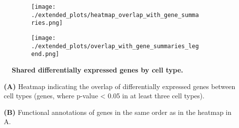 \begin{figure}[H] 
    \begin{subfigure}[t]{0.2\textwidth}
        \caption{}
        \texttt{[image: ./extended\_plots/heatmap\_overlap\_with\_gene\_summaries.png]}        
    \end{subfigure}   
    \begin{subfigure}[t]{0.8\textwidth}
        \caption{}
        \vspace{1cm}
        \texttt{[image: ./extended\_plots/overlap\_with\_gene\_summaries\_legend.png]}        
    \end{subfigure}   
    \caption{
        \textbf{Shared differentially expressed genes by cell type.}\\
    }
    \label{fig:snRNAseq_gene_scores_2}
\end{figure}
\begin{itemize}
    \item[\textbf{(A)}] Heatmap indicating the overlap of differentially expressed genes between cell types (genes, where p-value < 0.05 in at least three cell types). 
    \item[\textbf{(B)}] Functional annotations of genes in the same order as in the heatmap in A.
\end{itemize}